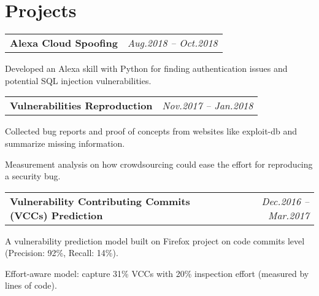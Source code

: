 \documentclass[a4paper,10pt]{article}
\newenvironment{packed_itemize}{
\begin{list}{\labelitemi}{\leftmargin=2em}
\setlength{\itemsep}{0pt}
\setlength{\parskip}{0pt}
\setlength{\parsep}{0pt}
\setlength{\headsep}{0pt}
\setlength{\topskip}{0pt}
\setlength{\topmargin}{0pt}
\setlength{\topsep}{0pt}
\setlength{\partopsep}{0pt}
}{\end{list}}
\begin{document}
\section{Projects}
\vspace{-0.2cm}

\begin{tabular}{p{15cm}r}
\textbf{Alexa Cloud Spoofing} & \emph{Aug.2018 – Oct.2018} \\
\end{tabular}

\begin{packed_itemize}
\item Developed an Alexa skill with Python for finding authentication issues and potential SQL injection vulnerabilities.
\end{packed_itemize}


\begin{tabular}{p{15cm}r}
\textbf{Vulnerabilities Reproduction} & \emph{Nov.2017 – Jan.2018} \\
\end{tabular}

\begin{packed_itemize}
\item Collected bug reports and proof of concepts from websites like exploit-db and summarize missing information.
\item Measurement analysis on how crowdsourcing could ease the effort for reproducing a security bug.
\end{packed_itemize}


\begin{tabular}{p{15cm}r}
\textbf{Vulnerability Contributing Commits (VCCs) Prediction} & \emph{Dec.2016 – Mar.2017} \\
\end{tabular}

\begin{packed_itemize}
\item A vulnerability prediction model built on Firefox project on code commits level (Precision: 92\%, Recall: 14\%).
\item Effort-aware model: capture 31\% VCCs with 20\% inspection effort (measured by lines of code).
\end{packed_itemize}
\end{document}
